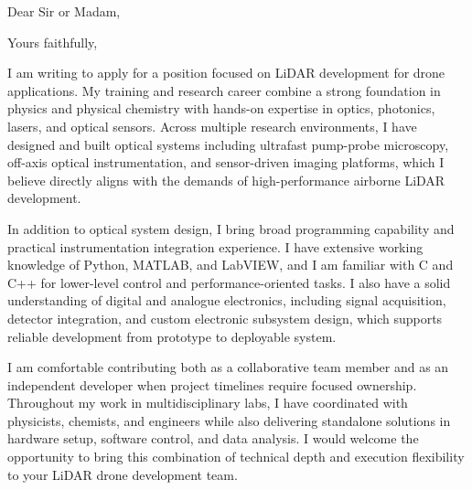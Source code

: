 \documentclass[11pt,a4paper]{moderncv}        %
\begin{document}

\date{\today}
\opening{Dear Sir or Madam,}
\closing{Yours faithfully,}
\makelettertitle

I am writing to apply for a position focused on LiDAR development for drone
applications. My training and research career combine a strong foundation in
physics and physical chemistry with hands-on expertise in optics, photonics,
lasers, and optical sensors. Across multiple research environments, I have
designed and built optical systems including ultrafast pump-probe microscopy,
off-axis optical instrumentation, and sensor-driven imaging platforms, which I
believe directly aligns with the demands of high-performance airborne LiDAR
development.

In addition to optical system design, I bring broad programming capability and
practical instrumentation integration experience. I have extensive working
knowledge of Python, MATLAB, and LabVIEW, and I am familiar with C and C++ for
lower-level control and performance-oriented tasks. I also have a solid
understanding of digital and analogue electronics, including signal acquisition,
detector integration, and custom electronic subsystem design, which supports
reliable development from prototype to deployable system.

I am comfortable contributing both as a collaborative team member and as an
independent developer when project timelines require focused ownership.
Throughout my work in multidisciplinary labs, I have coordinated with
physicists, chemists, and engineers while also delivering standalone solutions
in hardware setup, software control, and data analysis. I would welcome the
opportunity to bring this combination of technical depth and execution
flexibility to your LiDAR drone development team.

\makeletterclosing

\end{document}
